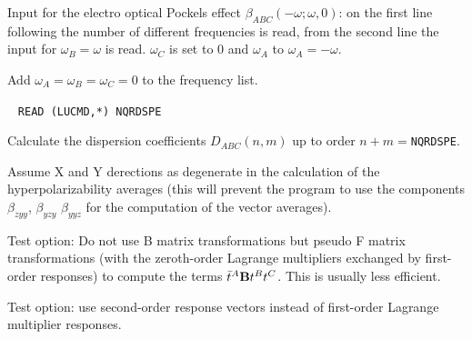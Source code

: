 \begin{description}
   Input for the electro optical Pockels effect 
   $\beta_{ABC}(-\omega;\omega,0)$:
   on the first line following  the number of different
   frequencies is read, from the second line the input for 
   $\omega_B = \omega$ is read. $\omega_C$ is set to $0$ and
   $\omega_A$ to $\omega_A = -\omega$.

\item[\Key{STATIC}] 
   Add $\omega_A = \omega_B = \omega_C = 0$ to the frequency list.

\item[\Key{DISPCF}]  \verb| |\newline
   \verb|READ (LUCMD,*) NQRDSPE|

   Calculate the dispersion coefficients 
   $D_{ABC}(n,m)$ up to order $n+m =$\verb+NQRDSPE+. 
 

\item[\Key{XYDEGE}] 
Assume X and Y derections as degenerate in the calculation
of the hyperpolarizability averages (this will prevent
the program to use the components $\beta_{zyy}$, $\beta_{yzy}$
$\beta_{yyz}$ for the computation of the vector averages).

\item[\Key{NOBMAT}] 
Test option:
Do not use B matrix transformations but pseudo F matrix 
transformations (with the zeroth-order Lagrange multipliers 
exchanged by first-order responses) to compute the terms
$\bar{t}^A {\bf B} t^{B} t^{C}$. This is usually less
efficient.

\item[\Key{USE R2}] 
Test option: use second-order response vectors instead of
first-order Lagrange multiplier responses.
 
\end{description}
